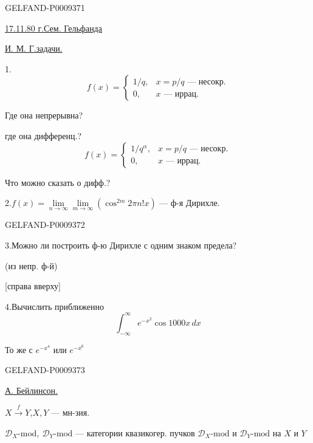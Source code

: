 \begin{GelfandAdjacentEvidence}{GELFAND-P000937}{1}

\underline{\underline{17.11.80 г.}}\qquad\underline{Сем. Гельфанда}

\underline{И. М. Г.}\qquad\underline{задачи.}

1.\quad
\[
 f(x)=\left\{\begin{array}{ll}
 1/q,&x=p/q\text{ --- несокр.}\\
 0,&x\text{ --- иррац.}
 \end{array}\right.
\]

Где она непрерывна?

где она дифференц.?
\[
 f(x)=\left\{\begin{array}{ll}
 1/q^\alpha,&x=p/q\text{ --- несокр.}\\
 0,&x\text{ --- иррац.}
 \end{array}\right.
\]

Что можно сказать о дифф.?

2.\quad $f(x)=\lim\limits_{n\to\infty}\lim\limits_{m\to\infty}(\cos^{2m}2\pi n!x)$ --- ф-я Дирихле.
\end{GelfandAdjacentEvidence}
\begin{GelfandAdjacentEvidence}{GELFAND-P000937}{2}


3.\quad Можно ли построить ф-ю Дирихле с одним знаком предела?

(из непр. ф-й)

[справа вверху]

4.\quad Вычислить приближенно
\[
 \int_{-\infty}^{\infty}e^{-x^2}\cos1000x\,dx
\]

То же с $e^{-x^4}$ или $e^{-x^6}$
\end{GelfandAdjacentEvidence}
\begin{GelfandAdjacentEvidence}{GELFAND-P000937}{3}


\underline{А. Бейлинсон.}

$X\overset f\longrightarrow Y$,\qquad $X,Y$ --- мн-зия.

$\mathcal D_X\text{-mod},\ \mathcal D_Y\text{-mod}$ --- категории квазикогер. пучков
$\mathcal D_X\text{-mod}$ и $\mathcal D_Y\text{-mod}$ на $X$ и $Y$
\end{GelfandAdjacentEvidence}
